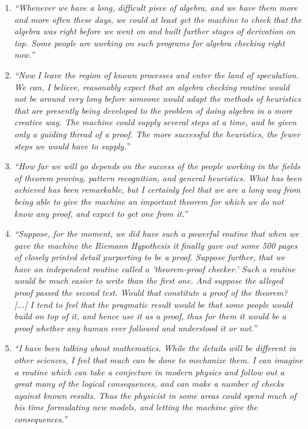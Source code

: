 \documentclass[graybox]{svmult}
\begin{document}
 \begin{small}
 
\begin{enumerate}
\item[C1] \textit{\textquotedblleft Whenever we have a long, difficult piece of algebra, and we have them more and more often these days, we could at least get the machine to check that the algebra was right before we went on and built further stages of derivation on top. Some people are working on such programs for algebra checking right now.\textquotedblright}

\item[C2] \textit{\textquotedblleft Now I leave the region of known processes and enter the land of speculation. We can, I believe, reasonably expect that an algebra checking routine would not be around very long before someone would adapt the methods of heuristics that are presently being developed to the problem of doing algebra in a more creative way. The machine could supply several steps at a time, and be given only a guiding thread of a proof. The more successful the heuristics, the fewer steps we would have to supply.\textquotedblright}

\item[C3] \textit{\textquotedblleft How far we will go depends on the success of the people working in the fields of theorem proving, pattern recognition, and general heuristics. What has been achieved has been remarkable, but I certainly feel that we are a long way from being able to give the machine an important theorem for which we do not know any proof, and expect to get one from it.\textquotedblright}

\item[C4] \textit{\textquotedblleft Suppose, for the moment, we did have such a powerful routine that when we gave the machine the Riemann Hypothesis it finally gave out some 500 pages of closely printed detail purporting to be a proof. Suppose further, that we have an independent routine called a 'theorem-proof checker.' Such a routine would be much easier to write than the first one. And suppose the alleged proof passed the second test. Would that constitute a proof of the theorem? [...] I tend to feel that the pragmatic result would be that some people would build on top of it, and hence use it as a proof, thus for them it would be a proof whether any human ever followed and understood it or not.\textquotedblright}

\item[C5] \textit{\textquotedblleft I have been talking about mathematics. While the details will be different in other sciences, I feel that much can be done to mechanize them. I can imagine a routine which can take a conjecture in modern physics and follow out a great many of the logical consequences, and can make a number of checks against known results. Thus the physicist in some areas could spend much of his time formulating new models, and letting the machine give the consequences.\textquotedblright}
\end{enumerate}
 \end{small}
\end{document}
